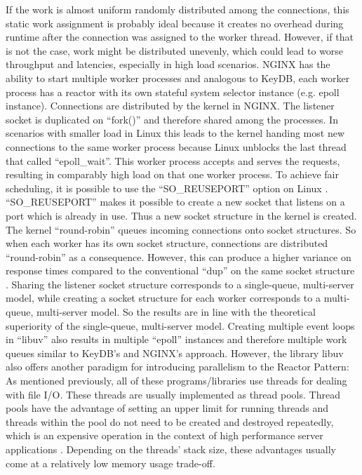 If the work is almost uniform randomly distributed among the connections, this static work assignment is probably ideal because it creates no overhead during runtime after the connection was assigned to the worker thread. However, if that is not the case, work might be distributed unevenly, which could lead to worse throughput and latencies, especially in high load scenarios. \newline
NGINX has the ability to start multiple worker processes and analogous to KeyDB, each worker process has a reactor with its own stateful system selector instance (e.g. epoll instance). Connections are distributed by the kernel in NGINX. The listener socket is duplicated on “fork()” and therefore shared among the processes. In scenarios with smaller load in Linux this leads to the kernel handing most new connections to the same worker process because Linux unblocks the last thread that called “epoll\_wait”. This worker process accepts and serves the requests, resulting in comparably high load on that one worker process. To achieve fair scheduling, it is possible to use the “SO\_REUSEPORT” option on Linux \cite{man:socket}. “SO\_REUSEPORT” makes it possible to create a new socket that listens on a port which is already in use. Thus a new socket structure in the kernel is created. The kernel “round-robin” queues incoming connections onto socket structures. So when each worker has its own socket structure, connections are distributed “round-robin” as a consequence. However, this can produce a higher variance on response times compared to the conventional “dup” on the same socket structure \cite{majkowski:nginx}. Sharing the listener socket structure corresponds to a single-queue, multi-server model, while creating a socket structure for each worker corresponds to a multi-queue, multi-server model. So the results are in line with the theoretical superiority of the single-queue, multi-server model.  \newline
Creating multiple event loops in “libuv” also results in multiple “epoll” instances and therefore multiple work queues similar to KeyDB’s and NGINX’s approach. However, the library libuv also offers another paradigm for introducing parallelism to the Reactor Pattern: 
As mentioned previously, all of these programs/libraries use threads for dealing with file I/O. These threads are usually implemented as thread pools. Thread pools have the advantage of setting an upper limit for running threads and threads within the pool do not need to be created and destroyed repeatedly, which is an expensive operation in the context of high performance server applications \cite[370-371]{herlihy:art_of_mp}. Depending on the threads’ stack size, these advantages usually come at a relatively low memory usage trade-off. 
